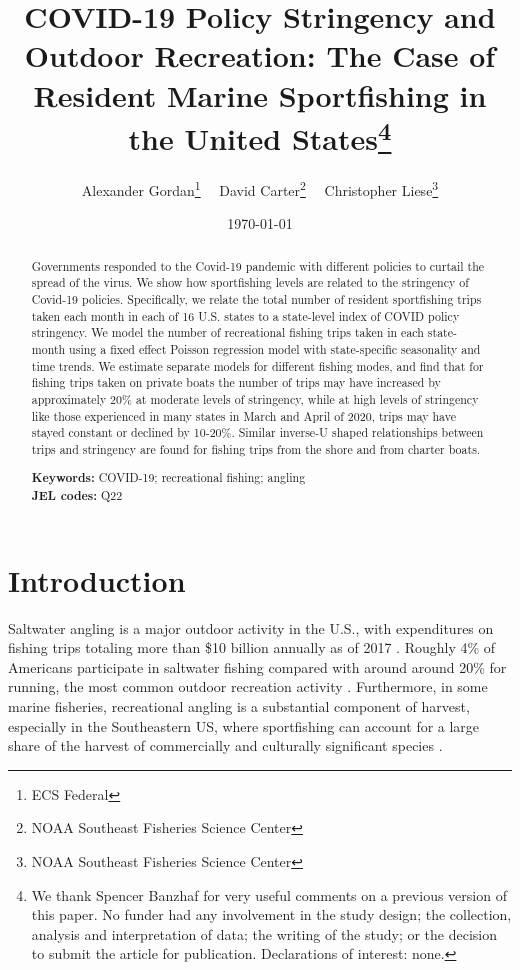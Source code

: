 \documentclass[12pt]{article}
\author{%
Alexander Gordan\thanks{ECS Federal}%
\ \ David Carter\thanks{NOAA Southeast Fisheries Science Center}%
\ \ Christopher Liese\thanks{NOAA Southeast Fisheries Science Center}%

}
\title{\vspace{-2.2cm}\bf{COVID-19 Policy Stringency and Outdoor Recreation: The Case of Resident
Marine Sportfishing in the United States}\footnote{We thank Spencer Banzhaf for very useful comments on a previous version of this paper.  No funder had any involvement in the study design; the collection, analysis and interpretation of data; the writing of the study; or the decision to submit the article for publication. Declarations of interest: none.}}
\begin{document}
\date{\today}
\maketitle
\thispagestyle{empty}

\newpage

\begin{abstract}
\noindent Governments responded to the Covid-19 pandemic with different policies
to curtail the spread of the virus. We show how sportfishing levels are
related to the stringency of Covid-19 policies. Specifically, we relate
the total number of resident sportfishing trips taken each month in each
of 16 U.S. states to a state-level index of COVID policy stringency. We
model the number of recreational fishing trips taken in each state-month
using a fixed effect Poisson regression model with state-specific
seasonality and time trends. We estimate separate models for different
fishing modes, and find that for fishing trips taken on private boats
the number of trips may have increased by approximately 20\% at moderate
levels of stringency, while at high levels of stringency like those
experienced in many states in March and April of 2020, trips may have
stayed constant or declined by 10-20\%. Similar inverse-U shaped
relationships between trips and stringency are found for fishing trips
from the shore and from charter boats.

\vspace{1cm}
\noindent \textbf{Keywords:} COVID-19; recreational fishing; angling \\
\textbf{JEL codes:} Q22

\end{abstract}
\newpage{}

\section{Introduction}

Saltwater angling is a major outdoor activity in the U.S., with expenditures on fishing trips totaling more than \$10 billion annually
as of 2017 \citep{lovell2020economic}. Roughly 4\% of Americans participate in saltwater fishing compared with around around 20\% for running, the most common outdoor recreation activity \citep{2019OutdoorReport}.  Furthermore, in some marine fisheries, recreational angling is a substantial component of harvest, especially in the Southeastern US, where sportfishing can account for a large share of the harvest of commercially and culturally significant species \citep{lewin2019potential}. 
\end{document}
